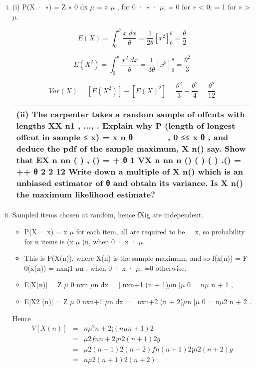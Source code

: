 \documentclass[a4paper,12pt]{article}
\begin{document}
\begin{enumerate}[(i)]
\item (i) P(X · ») =
Z »
0
dx
$\mu$
= »
$\mu$
, for 0 · » · $\mu$; = 0 for » < 0; = 1 for » > $\mu$.

\[E(X) = \int^{\theta}_{0} \frac{x\;dx}{\theta} = \frac{1}{2\theta}\left[ x^2 \right]^{\theta}_{0} = \frac{\theta}{2}\]



\[E(X^2) = \int^{\theta}_{0} \frac{x^2\;dx}{\theta} = \frac{1}{3\theta}\left[ x^3 \right]^{\theta}_{0} = \frac{\theta^2}{3}\]

\[ Var(X) = [E(X^2)] - [E(X)^2] = \frac{\theta^2}{3} - \frac{\theta^2}{4} = \frac{\theta^2}{12}\]
\newpage
 \begin{table}[ht!]
 \centering
 \begin{tabular}{|p{15cm}|}
 \hline  
(ii) The carpenter takes a random sample of offcuts with lengths XX n1 , ..., . Explain why
P (length of longest offcut in sample ≤ x) = 
x n θ
  
   ,  0 ≤≤ x θ ,
and deduce the pdf of the sample maximum, X n() say.
Show that
EX
n nn ( ) , () = + θ 1
VX
n
nn
n ()
( ) ( ) .() = ++ θ 2 2 12
Write down a multiple of  X n() which is an unbiased estimator of 
θ
 and obtain its
variance.
Is  X n() the maximum likelihood estimate? \\ \hline 
  \end{tabular}
\end{table}
\item Sampled items chosen at random, hence fXig are independent. 
\begin{itemize}
\item P(X · x) =
x
$\mu$ for each item, all are required to be · x, so probability for n items is (x
$\mu$ )n,
when 0 · x · $\mu$. 
\item This is F(X(n)), where X(n) is the sample maximum, and
so f(x(n)) = F
0(x(n)) = nxn¡1
$\mu$n , when 0 · x · $\mu$, =0 otherwise.
\item E[X(n)] =
Z $\mu$
0
nxn
$\mu$n dx = [ nxn+1
(n + 1)$\mu$n ]$\mu$
0 = n$\mu$
n + 1
,
\item E[X2
(n)] =
Z $\mu$
0
nxn+1
$\mu$n dx = [ nxn+2
(n + 2)$\mu$n ]$\mu$
0 = n$\mu$2
n + 2
.

\end{itemize}
Hence
\begin{eqnarray*}
V [X(n)] &=& n\mu^2
n+2 ¡ ( n\mu
n+1)2\\ &=& \mu2f n
n+2 ¡ n2
(n+1)2 g\\
&=& \mu2
(n+1)2(n+2)fn(n + 1)2 ¡ n2(n + 2)g \\ &=& 
n \mu 2
(n+1)2(n+2) :
\end{eqnarray*}


\end{enumerate}
\end{document}

